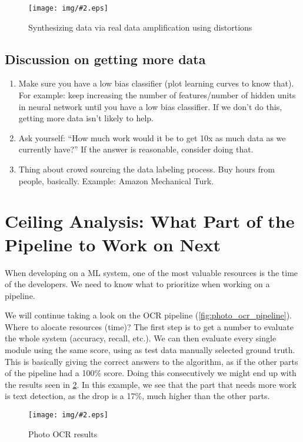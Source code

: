 \documentclass[10pt]{extarticle}
\newcommand{\stdfig}[3]{
    \begin{figure}
    \centering
    \texttt{[image: img/\#2.eps]}
    \caption{#3}
    \label{fig:#2}
    \end{figure}
}
\begin{document}
\stdfig{10cm}{real_data_distortion}{Synthesizing data via real data amplification using distortions}

\subsection{Discussion on getting more
data}\label{discussion-on-getting-more-data}

\begin{enumerate}
\def\labelenumi{\arabic{enumi}.}
\item
  Make sure you have a low bias classifier (plot learning curves to know
  that). For example: keep increasing the number of features/number of
  hidden units in neural network until you have a low bias classifier.
  If we don't do this, getting more data isn't likely to help.
\item
  Ask yourself: ``How much work would it be to get 10x as much data as
  we currently have?'' If the answer is reasonable, consider doing that.
\item
  Thing about crowd sourcing the data labeling process. Buy hours from
  people, basically. Example: Amazon Mechanical Turk.
\end{enumerate}

\section{Ceiling Analysis: What Part of the Pipeline to Work on
Next}\label{ceiling-analysis-what-part-of-the-pipeline-to-work-on-next}

When developing on a ML system, one of the most valuable resources is
the time of the developers. We need to know what to prioritize when
working on a pipeline. \smallskip

We will continue taking a look on the OCR pipeline
(\cref{fig:photo_ocr_pipeline}). Where to alocate resources (time)? The
first step is to get a number to evaluate the whole system (accuracy,
recall, etc.). We can then evaluate every single module using the same
score, using as test data manually selected ground truth. This is
basically giving the correct answers to the algorithm, as if the other
parts of the pipeline had a 100\% score. Doing this consecutively we
might end up with the results seen in \cref{fig:ocr_initial_results}. In
this example, we see that the part that needs more work is text
detection, as the drop is a 17\%, much higher than the other parts.

\stdfig{10cm}{ocr_initial_results}{Photo OCR results}




\clearpage



    \nocite{*}



\end{document}
